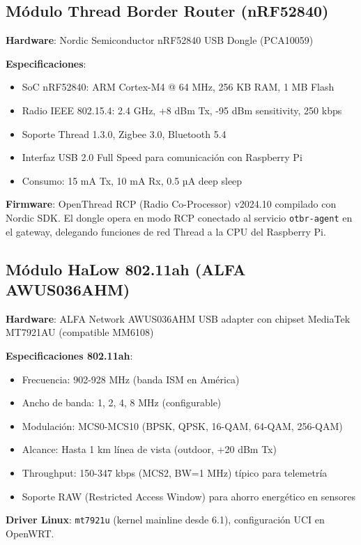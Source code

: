\subsection{Módulo Thread Border Router (nRF52840)}

\textbf{Hardware}: Nordic Semiconductor nRF52840 USB Dongle (PCA10059)

\textbf{Especificaciones}:
\begin{itemize}
    \item SoC nRF52840: ARM Cortex-M4 @ 64 MHz, 256 KB RAM, 1 MB Flash
    \item Radio IEEE 802.15.4: 2.4 GHz, +8 dBm Tx, -95 dBm sensitivity, 250 kbps
    \item Soporte Thread 1.3.0, Zigbee 3.0, Bluetooth 5.4
    \item Interfaz USB 2.0 Full Speed para comunicación con Raspberry Pi
    \item Consumo: 15 mA Tx, 10 mA Rx, 0.5 µA deep sleep
\end{itemize}

\textbf{Firmware}: OpenThread RCP (Radio Co-Processor) v2024.10 compilado con Nordic SDK. El dongle opera en modo RCP conectado al servicio \texttt{otbr-agent} en el gateway, delegando funciones de red Thread a la CPU del Raspberry Pi.

\subsection{Módulo HaLow 802.11ah (ALFA AWUS036AHM)}

\textbf{Hardware}: ALFA Network AWUS036AHM USB adapter con chipset MediaTek MT7921AU (compatible MM6108)

\textbf{Especificaciones 802.11ah}:
\begin{itemize}
    \item Frecuencia: 902-928 MHz (banda ISM en América)
    \item Ancho de banda: 1, 2, 4, 8 MHz (configurable)
    \item Modulación: MCS0-MCS10 (BPSK, QPSK, 16-QAM, 64-QAM, 256-QAM)
    \item Alcance: Hasta 1 km línea de vista (outdoor, +20 dBm Tx)
    \item Throughput: 150-347 kbps (MCS2, BW=1 MHz) típico para telemetría
    \item Soporte RAW (Restricted Access Window) para ahorro energético en sensores
\end{itemize}

\textbf{Driver Linux}: \texttt{mt7921u} (kernel mainline desde 6.1), configuración UCI en OpenWRT.

